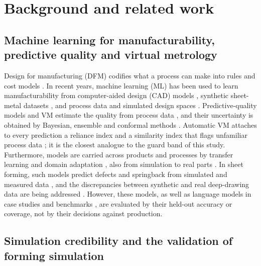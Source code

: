 \documentclass[pdflatex,sn-basic,lineno]{sn-jnl}
\begin{document}
\section{Background and related work}\label{sec:background}

\subsection{Machine learning for manufacturability, predictive quality and virtual metrology}

Design for manufacturing (DFM) codifies what a process can make into rules and cost models \citep{boothroyd2010product}. In recent years, machine learning (ML) has been used to learn manufacturability from computer-aided design (CAD) models \citep{ghadai2018learning, zhang2018featurenet}, synthetic sheet-metal datasets \citep{ballegeer2026bendfm}, and process data and simulated design spaces \citep{yan2026machine}. Predictive-quality models and VM estimate the quality from process data \citep{wuest2016machine, tercan2022machine, dreyfus2022virtual}, and their uncertainty is obtained by Bayesian, ensemble and conformal methods \citep{nemani2023uncertainty, heddoub2026conformal}. Automatic VM attaches to every prediction a reliance index and a similarity index that flags unfamiliar process data \citep{cheng2008evaluating, cheng2012developing}; it is the closest analogue to the guard band of this study. Furthermore, models are carried across products and processes by transfer learning and domain adaptation \citep{maschler2021deep}, also from simulation to real parts \citep{tercan2018transfer}. In sheet forming, such models predict defects and springback from simulated and measured data \citep{cao2024artificial, heinzelmann2025datadriven}, and the discrepancies between synthetic and real deep-drawing data are being addressed \citep{baum2026addressing}. However, these models, as well as language models in case studies \citep{makatura2024how} and benchmarks \citep{picard2025concept}, are evaluated by their held-out accuracy or coverage, not by their decisions against production.

\subsection{Simulation credibility and the validation of forming simulation}
\end{document}

